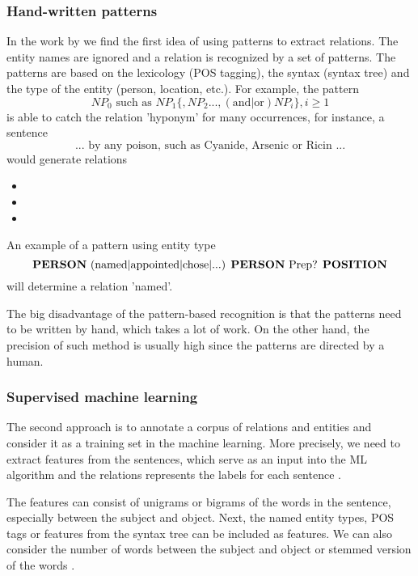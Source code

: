 \documentclass[
  digital, %
  table,   %
  lof,     %
  lot,     %
]{fithesis3}
\begin{document}
\subsubsection{\textbf{Hand-written patterns}}
In the work  by \citeauthor{hearst1992automatic} \cite{hearst1992automatic} we find the first idea of using patterns to extract relations.
The entity names are ignored and a relation is recognized by a set of patterns.
The patterns are based on the lexicology (POS tagging), the syntax (syntax tree) and the type of the entity (person, location, etc.).
For example, the pattern \cite[sec. 21.2]{jurafsky2014speech}
$$
NP_0\text{ such as }NP_1 \{, NP_2 ..., (\text{and|or})NP_i \}, i \geq 1
$$
is able to catch the relation 'hyponym' for many occurrences, for instance, a sentence
$$
\text{... by any poison, such as Cyanide, Arsenic or Ricin ...}
$$
would generate relations 
\begin{itemize}
\item <poison, hyponym of, Cyanide>
\item <poison, hyponym of, Arsenic>
\item <poison, hyponym of, Ricin>
\end{itemize}
An example of a pattern using entity type \cite[sec. 21.2]{jurafsky2014speech}
$$
\text{\textbf{PERSON} (named|appointed|chose|...) \textbf{PERSON} Prep? \textbf{POSITION}}
$$
will determine a relation 'named'. 

The big disadvantage of the pattern-based recognition is that the patterns need to be written by hand, which takes a lot of work. On the other hand, the precision of such method is usually high since the patterns are directed by a human.

\subsubsection{\textbf{Supervised machine learning}}
The second approach is to annotate a corpus of relations and entities and consider it as a training set in the machine learning.
More precisely, we need to extract features from the sentences, which serve as an input into the ML algorithm and the relations represents the labels for each sentence
\cite[sec 21.2]{jurafsky2014speech}.

The features can consist of unigrams or bigrams of the words in the sentence, especially between the subject and object. Next, the named entity types, POS tags or features from the syntax tree can be included as features. We can also consider the number of words between the subject and object or stemmed version of the words \cite[sec. 21.2]{jurafsky2014speech}.
\end{document}
